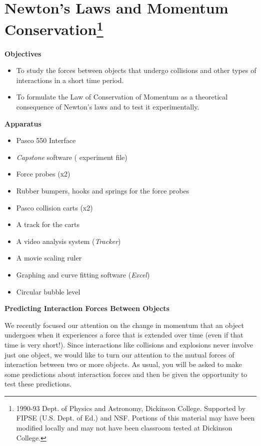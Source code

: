 
\section{Newton's Laws and Momentum Conservation\footnote{
1990-93 Dept. of Physics and Astronomy, Dickinson College. Supported by FIPSE
(U.S. Dept. of Ed.) and NSF. Portions of this material may have been modified
locally and may not have been classroom tested at Dickinson College.
}}

\makelabheader %

\bigskip
\textbf{Objectives }

\begin{itemize}[nosep]
\item To study the forces between objects that undergo collisions and other types
of interactions in a short time period. 
\item To formulate the Law of Conservation of Momentum as a theoretical consequence
of Newton's laws and to test it experimentally.
\end{itemize}

\bigskip
\textbf{Apparatus}

\begin{itemize}[nosep]
\item Pasco 550 Interface
\item \textit{Capstone} software ( experiment file)
\item Force probes (x2)
\item Rubber bumpers, hooks and springs for the force probes
\item Pasco collision carts (x2)
\item A track for the carts
\item A video analysis system (\textit{Tracker})
\item A movie scaling ruler
\item Graphing and curve fitting software (\textit{Excel})
\item Circular bubble level

\end{itemize}
\textbf{Predicting Interaction Forces Between Objects} 

We recently focused our attention on the change in momentum that an object undergoes
when it experiences a force that is extended over time (even if that time is
very short!). Since interactions like collisions and explosions never involve
just one object, we would like to turn our attention to the mutual forces of
interaction between two or more objects. As usual, you will be asked to make
some predictions about interaction forces and then be given the opportunity
to test these predictions. 

